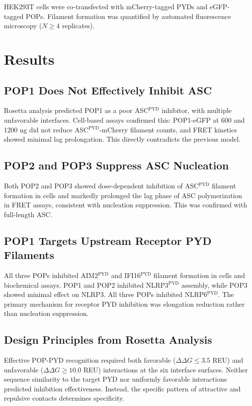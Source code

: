 \documentclass[11pt]{article}
\begin{document}
HEK293T cells were co-transfected with mCherry-tagged PYDs and eGFP-tagged POPs. Filament formation was quantified by automated fluorescence microscopy ($N \geq 4$ replicates).

\section{Results}

\subsection{POP1 Does Not Effectively Inhibit ASC}

Rosetta analysis predicted POP1 as a poor ASC$^{\text{PYD}}$ inhibitor, with multiple unfavorable interfaces. Cell-based assays confirmed this: POP1-eGFP at 600 and 1200 ng did not reduce ASC$^{\text{PYD}}$-mCherry filament counts, and FRET kinetics showed minimal lag prolongation. This directly contradicts the previous model.

\subsection{POP2 and POP3 Suppress ASC Nucleation}

Both POP2 and POP3 showed dose-dependent inhibition of ASC$^{\text{PYD}}$ filament formation in cells and markedly prolonged the lag phase of ASC polymerization in FRET assays, consistent with nucleation suppression. This was confirmed with full-length ASC.

\subsection{POP1 Targets Upstream Receptor PYD Filaments}

All three POPs inhibited AIM2$^{\text{PYD}}$ and IFI16$^{\text{PYD}}$ filament formation in cells and biochemical assays. POP1 and POP2 inhibited NLRP3$^{\text{PYD}}$ assembly, while POP3 showed minimal effect on NLRP3. All three POPs inhibited NLRP6$^{\text{PYD}}$. The primary mechanism for receptor PYD inhibition was elongation reduction rather than nucleation suppression.

\subsection{Design Principles from Rosetta Analysis}

Effective POP-PYD recognition required both favorable ($\Delta\Delta G \leq 3.5$ REU) and unfavorable ($\Delta\Delta G \geq 10.0$ REU) interactions at the six interface surfaces. Neither sequence similarity to the target PYD nor uniformly favorable interactions predicted inhibition effectiveness. Instead, the specific pattern of attractive and repulsive contacts determines specificity.
\end{document}
